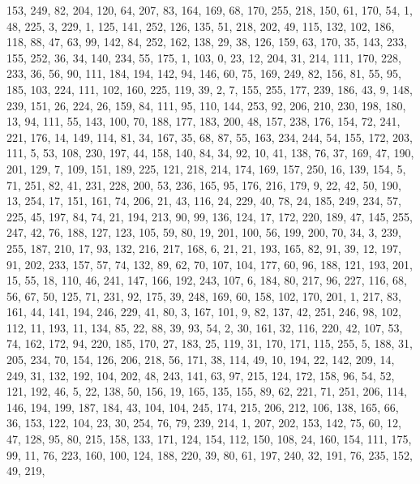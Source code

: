 \begin{DoxyCode}
       153, 249, 82, 204, 120, 64, 207, 83, 164, 169, 68, 170, 255, 218, 150, 61, 170, 54, 1, 48, 225, 3, 229, 1,
       125, 141, 252, 126, 135, 51, 218, 202, 49, 115, 132, 102, 186, 118, 88, 47, 63, 99, 142, 84, 252, 162, 138, 29,
       38, 126, 159, 63, 170, 35, 143, 233, 155, 252, 36, 34, 140, 234, 55, 175, 1, 103, 0, 23, 12, 204, 31, 214,
       111, 170, 228, 233, 36, 56, 90, 111, 184, 194, 142, 94, 146, 60, 75, 169, 249, 82, 156, 81, 55, 95, 185,
       103, 224, 111, 102, 160, 225, 119, 39, 2, 7, 155, 255, 177, 239, 186, 43, 9, 148, 239, 151, 26, 224, 26, 159,
       84, 111, 95, 110, 144, 253, 92, 206, 210, 230, 198, 180, 13, 94, 111, 55, 143, 100, 70, 188, 177, 183, 200,
       48, 157, 238, 176, 154, 72, 241, 221, 176, 14, 149, 114, 81, 34, 167, 35, 68, 87, 55, 163, 234, 244, 54, 155,
       172, 203, 111, 5, 53, 108, 230, 197, 44, 158, 140, 84, 34, 92, 10, 41, 138, 76, 37, 169, 47, 190, 201, 129,
       7, 109, 151, 189, 225, 121, 218, 214, 174, 169, 157, 250, 16, 139, 154, 5, 71, 251, 82, 41, 231, 228, 200,
       53, 236, 165, 95, 176, 216, 179, 9, 22, 42, 50, 190, 13, 254, 17, 151, 161, 74, 206, 21, 43, 116, 24, 229,
       40, 78, 24, 185, 249, 234, 57, 225, 45, 197, 84, 74, 21, 194, 213, 90, 99, 136, 124, 17, 172, 220, 189, 47,
       145, 255, 247, 42, 76, 188, 127, 123, 105, 59, 80, 19, 201, 100, 56, 199, 200, 70, 34, 3, 239, 255, 187, 210,
       17, 93, 132, 216, 217, 168, 6, 21, 21, 193, 165, 82, 91, 39, 12, 197, 91, 202, 233, 157, 57, 74, 132, 89,
       62, 70, 107, 104, 177, 60, 96, 188, 121, 193, 201, 15, 55, 18, 110, 46, 241, 147, 166, 192, 243, 107, 6, 184,
       80, 217, 96, 227, 116, 68, 56, 67, 50, 125, 71, 231, 92, 175, 39, 248, 169, 60, 158, 102, 170, 201, 1, 217,
       83, 161, 44, 141, 194, 246, 229, 41, 80, 3, 167, 101, 9, 82, 137, 42, 251, 246, 98, 102, 112, 11, 193, 11,
       134, 85, 22, 88, 39, 93, 54, 2, 30, 161, 32, 116, 220, 42, 107, 53, 74, 162, 172, 94, 220, 185, 170, 27,
       183, 25, 119, 31, 170, 171, 115, 255, 5, 188, 31, 205, 234, 70, 154, 126, 206, 218, 56, 171, 38, 114, 49, 10,
       194, 22, 142, 209, 14, 249, 31, 132, 192, 104, 202, 48, 243, 141, 63, 97, 215, 124, 172, 158, 96, 54, 52,
       121, 192, 46, 5, 22, 138, 50, 156, 19, 165, 135, 155, 89, 62, 221, 71, 251, 206, 114, 146, 194, 199, 187, 184,
       43, 104, 104, 245, 174, 215, 206, 212, 106, 138, 165, 66, 36, 153, 122, 104, 23, 30, 254, 76, 79, 239, 214,
       1, 207, 202, 153, 142, 75, 60, 12, 47, 128, 95, 80, 215, 158, 133, 171, 124, 154, 112, 150, 108, 24, 160,
       154, 111, 175, 99, 11, 76, 223, 160, 100, 124, 188, 220, 39, 80, 61, 197, 240, 32, 191, 76, 235, 152, 49, 219,

\end{DoxyCode}
